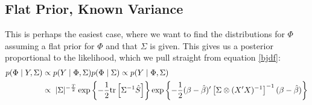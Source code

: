 \documentclass[a4paper,12pt]{scrartcl}
\begin{document}
\subsection{Flat Prior, Known Variance}

This is perhaps the easiest case, where we want to find
the distributions for $\Phi$ assuming a flat prior for
$\Phi$ and that $\Sigma$ is given. This gives us
a posterior proportional to the likelihood, which we
pull straight from equation \ref{bjdf}:
\begin{align*}
    p(\Phi \; | \; Y, \Sigma) &\propto p( Y \; | \; \Phi, \Sigma)
	p(\Phi \; | \; \Sigma) \propto p(Y \; |\; \Phi, \Sigma) \\
    &\propto 	
	\;|\Sigma|^{-\frac{T}{2}} 
	\exp\left\{ -\frac{1}{2} \text{tr} \left[\Sigma^{-1}
	\hat{S} \right] \right\} \notag 
	\exp\left\{ -\frac{1}{2} 
	(\beta - \hat{\beta})'
	\left[\Sigma \otimes (X'X)^{-1}\right]^{-1} 
	(\beta - \hat{\beta}) 
	\right\} \notag
\end{align*}






\newpage








 

\end{document}
